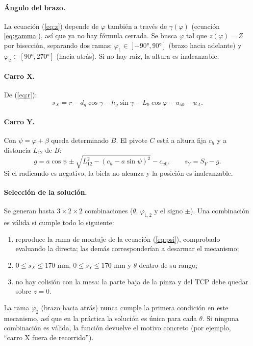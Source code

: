\documentclass[a4paper,12pt]{article}
\begin{document}
\paragraph{Ángulo del brazo.} La ecuación (\ref{eq:z}) depende de $\varphi$ también a través de $\gamma(\varphi)$
(ecuación \ref{eq:gamma}), así que ya no hay fórmula cerrada. Se busca $\varphi$ tal que $z(\varphi) = Z$ por
bisección, separando dos ramas: $\varphi_1 \in [-90°, 90°]$ (brazo hacia adelante) y
$\varphi_2 \in [90°, 270°]$ (hacia atrás). Si no hay raíz, la altura es inalcanzable.

\paragraph{Carro X.} De (\ref{eq:r}):
\begin{equation}
s_X = r - d_g\cos\gamma - h_g\sin\gamma - L_9\cos\varphi - u_{50} - u_A .
\end{equation}

\paragraph{Carro Y.} Con $\psi = \varphi + \beta$ queda determinado $B$. El pivote $C$ está a altura
fija $c_h$ y a distancia $L_{12}$ de $B$:
\begin{equation}
g = a\cos\psi \pm \sqrt{L_{12}^2 - \left(c_h - a\sin\psi\right)^2} - c_{u0},\qquad s_Y = S_Y - g .
\end{equation}
Si el radicando es negativo, la biela no alcanza y la posición es inalcanzable.

\paragraph{Selección de la solución.} Se generan hasta $3\times2\times2$ combinaciones ($\theta$,
$\varphi_{1,2}$ y el signo $\pm$). Una combinación es válida si cumple todo lo siguiente:
\begin{enumerate}
\item reproduce la rama de montaje de la ecuación (\ref{eq:psi}), comprobado evaluando la directa; las
      demás corresponderían a desarmar el mecanismo;
\item $0 \le s_X \le 170$ mm, $0 \le s_Y \le 170$ mm y $\theta$ dentro de su rango;
\item no hay colisión con la mesa: la parte baja de la pinza y del TCP debe quedar sobre $z = 0$.
\end{enumerate}
La rama $\varphi_2$ (brazo hacia atrás) nunca cumple la primera condición en este mecanismo, así que en la
práctica la solución es única para cada $\theta$. Si ninguna combinación es válida, la función devuelve el
motivo concreto (por ejemplo, ``carro X fuera de recorrido'').
\end{document}
